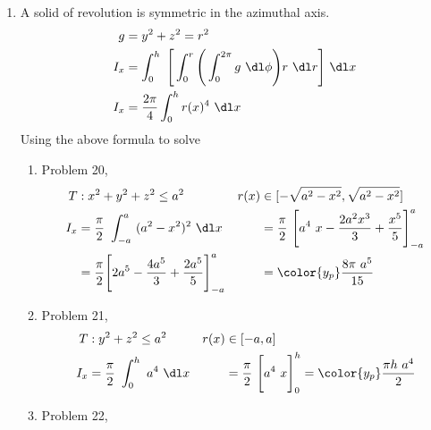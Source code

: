 \begin{enumerate}
     \item A solid of revolution is symmetric in the azimuthal axis.
           \begin{align}
                g   & = y^2 + z^2 = r^2                                        \\
                I_x & = \int_{0}^{h}\ \Bigg[\int_{0}^{r} \Bigg(\int_{0}^{2\pi}
                g\ \dl \phi \Bigg) r\ \dl r\Bigg]\ \dl x                       \\
                I_x & = \frac{2\pi}{4} \int_{0}^{h} r(x)^4\ \dl x
           \end{align}
           Using the above formula to solve
           \begin{enumerate}
                \item Problem 20,
                      \begin{align}
                           T               & : x^2 + y^2 + z^2 \leq a^2         &
                           r(x)            & \in [-\sqrt{a^2 - x^2},
                           \sqrt{a^2 - x^2}]                                      \\
                           I_x             & = \frac{\pi}{2}\ \int_{-a}^{a}
                           \ (a^2 - x^2)^2
                           \ \dl x         &
                                           & = \frac{\pi}{2}\ \Bigg[ a^4\ x
                           - \frac{2a^2x^3}{3} + \frac{x^5}{5} \Bigg]_{-a}^{a}    \\
                                           & = \frac{\pi}{2} \Bigg[ 2a^5
                                - \frac{4a^5}{3} +
                                \frac{2a^5}{5}
                           \Bigg]_{-a}^{a} &
                                           & = \color{y_p} \frac{8\pi\ a^5}{15}
                      \end{align}
                \item Problem 21,
                      \begin{align}
                           T       & : y^2 + z^2 \leq a^2                          &
                           r(x)    & \in [-a, a]                                     \\
                           I_x     & = \frac{\pi}{2}\ \int_{0}^{h}\ a^4
                           \ \dl x &
                                   & = \frac{\pi}{2}\ \Bigg[ a^4\ x \Bigg]_{0}^{h}
                           = \color{y_p} \frac{\pi h\ a^4}{2}
                      \end{align}
                \item Problem 22,

\end{enumerate}
\end{enumerate}
